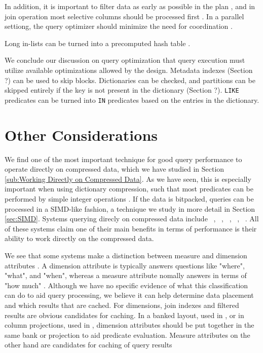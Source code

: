 In addition, it is important to filter data as early as possible in the plan \cite{Lamb2012-kg}, and in join operation  most selective columns should be processed first \cite{Holloway2008-rr}. In a parallel settiong, the query optimizer should minimize the need for coordination \cite{Exasol2014-xh}.

Long in-lists can be turned into a precomputed hash table \cite{Raman2013-em}.

We conclude our discussion on query optimization that query execution must utilize available optimizations allowed by the design. Metadata indexes (Section ?) can be used to skip blocks. Dictionaries can be checked, and partitions can be skipped entirely if the key is not present in the dictionary (Section ?). \texttt{LIKE} predicates can be turned into \texttt{IN} predicates based on the entries in the dictionary.


\section{Other Considerations}
\label{sec:Other Considerations}
We find one of the most important technique for good query performance to operate directly on compressed data, which we have studied in Section \ref{sub:Working Directly on Compressed Data}. As we have seen, this is especially important when using dictionary compression, such that most predicates can be performed by simple integer operations \cite{Abadi2008-dd}. If the data is bitpacked, queries can be processed in a SIMD-like fashion, a technique we study in more detail in Section \ref{sec:SIMD}. Systems querying direcly on compressed data include \cstore~\cite{Stonebraker-qz}, \ibm~\cite{Raman2013-em}, \mssql~\cite{Larson2013-mc}, \blink~\cite{Johnson2008-cp}, \sapnw~\cite{Lemke2010-is}. All of these systems claim one of their main benefits in terms of performance is their ability to work directly on the compressed data.


We see that some systems make a distinction between measure and dimension attributes \cite{Kamkolkar2015-iq, Johnson2008-cp}. A dimension attribute is typically answers questions like "where", "what", and "when", whereas a measure attribute nomally answers in terms of "how much" \cite{noauthor_undated-es}. Although we have no specific evidence of what this classification can do to aid query processing, we believe it can help determine data placement and which results that are cached. For dimensions, join indexes and filtered results are obvious candidates for caching. In a banked layout, used in \blink, or in column projections, used in \cstore, dimension attributes should be put together in the same bank or projection to aid predicate evaluation. Measure attributes on the other hand are candidates for caching of query results

